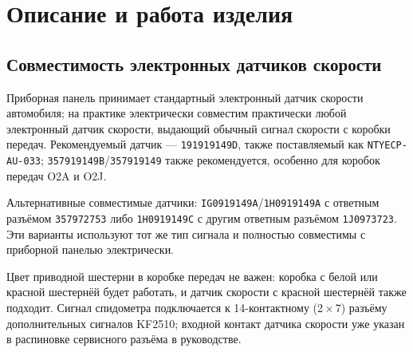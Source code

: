\chapter{Описание и работа изделия}\label{ch:description}

\section{Совместимость электронных датчиков скорости}
Приборная панель принимает стандартный электронный датчик скорости автомобиля; на практике электрически совместим практически любой электронный датчик скорости, выдающий обычный сигнал скорости с коробки передач.
Рекомендуемый датчик --- \texttt{191919149D}, также поставляемый как \texttt{NTYECP-AU-033}; \texttt{357919149B}/\texttt{357919149} также рекомендуется, особенно для коробок передач O2A и O2J.

Альтернативные совместимые датчики: \texttt{IG0919149A}/\texttt{1H0919149A} с ответным разъёмом \texttt{357972753} либо \texttt{1H0919149C} с другим ответным разъёмом \texttt{1J0973723}.
Эти варианты используют тот же тип сигнала и полностью совместимы с приборной панелью электрически.

Цвет приводной шестерни в коробке передач не важен: коробка с белой или красной шестернёй будет работать, и датчик скорости с красной шестернёй также подходит.
Сигнал спидометра подключается к 14-контактному (2\,$\times$\,7) разъёму дополнительных сигналов KF2510; входной контакт датчика скорости уже указан в распиновке сервисного разъёма в руководстве.
